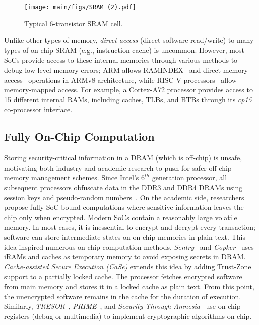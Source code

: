  \begin{figure}
    \centering
    \texttt{[image: main/figs/SRAM (2).pdf]}
    \caption{Typical 6-transistor SRAM cell.}
    \label{fig:sram_schematic} 

\end{figure}

Unlike other types of memory, \textit{direct access} (\ie direct software read/write) to many types of on-chip SRAM (e.g., instruction cache) is uncommon.
However, most SoCs provide access to these internal memories through various methods to debug low-level memory errors; 
ARM allows RAMINDEX~\cite{A72} and direct memory access~\cite{a53Trm} operations in ARMv8 architecture, while RISC V processors~\cite{SiFive} allow memory-mapped access.
For example, a Cortex-A72 processor provides access to 15 different internal RAMs, including caches, TLBs, and BTBs through its \textit{cp15} co-processor interface.

\subsection{Fully On-Chip Computation}

Storing security-critical information in a DRAM (which is off-chip) is unsafe, motivating both industry and academic research to push for safer off-chip memory management schemes. 
Since Intel's $6^{th}$ generation processor, all subsequent processors obfuscate data in the DDR3 and DDR4 DRAMs using session keys and pseudo-random numbers~\cite{mosalikanti2011high, yitbarek_cold_2017}. 
On the academic side, researchers propose fully SoC-bound computations where sensitive information leaves the chip only when encrypted.
Modern SoCs contain a reasonably large volatile memory.
In most cases, it is inessential to encrypt and decrypt every transaction;
software can store intermediate states on on-chip memories in plain text.
This idea inspired numerous on-chip computation methods.
\textit{Sentry}~\cite{Sentry} and \textit{Copker}~\cite{guan2016copker} uses iRAMs and caches as temporary memory to avoid exposing secrets in DRAM. 
\textit{Cache-assisted Secure Execution (CaSe)} extends this idea by adding Trust-Zone support to a partially locked cache.
The processor fetches encrypted software from main memory and stores it in a locked cache as plain text.
From this point, the unencrypted software remains in the cache for the duration of execution. 
Similarly, \textit{TRESOR}~\cite{TRESOR_2011}, \textit{PRIME}~\cite{PRIME_RSA_implementation_on_chip}, and \textit{Security Through Amnesia}~\cite{sec_through_amnesia} use on-chip registers (\eg debug or multimedia) to implement cryptographic algorithms on-chip. 

